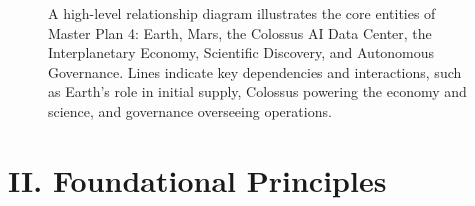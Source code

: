 \documentclass[fontsize=10pt, oneside, DIV=calc]{scrartcl}
\begin{document}
\begin{figure}[H]
  \centering
  \noindent
  \begin{minipage}{\textwidth}
    \centering
    \caption{A high-level relationship diagram illustrates the core entities of Master Plan 4: Earth, Mars, the Colossus AI Data Center, the Interplanetary Economy, Scientific Discovery, and Autonomous Governance. Lines indicate key dependencies and interactions, such as Earth's role in initial supply, Colossus powering the economy and science, and governance overseeing operations.}
  \end{minipage}
\end{figure}

\begin{comment}
@startuml
!theme carbon-gray
scale 1.6

skinparam defaultFontColor black
skinparam backgroundColor white


title ``Master Plan 4: Core Entities''

skinparam componentStyle rectangle

component ``Earth'' as Earth
component ``Mars'' as Mars

component ``Colossus\nAI Data Center'' as Colossus
component ``Interplanetary\nEconomy'' as Economy
component ``Scientific\nDiscovery'' as Science
component ``Autonomous\nGovernance'' as Governance

Earth --> Mars : ``Initial Supply''

Mars -down-> Colossus : ``Hosts''
Mars -down-> Economy : ``Hosts''
Mars -down-> Science : ``Hosts''
Mars -down-> Governance : ``Hosts''

Colossus --> Economy : ``Powers\nEconomy''
Colossus --> Science : ``Drives\nScience''

Science --> Economy : ``Generates\nValue''

Governance -left-> Mars : ``Oversees\nMars Hub''

@enduml
\end{comment}





            
\section*{II. Foundational Principles}

\end{document}
